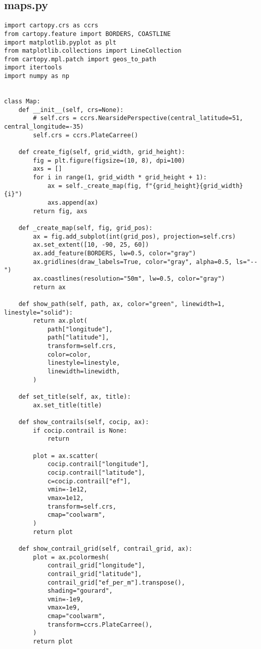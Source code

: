 \subsection{maps.py}
\begin{verbatim}
import cartopy.crs as ccrs
from cartopy.feature import BORDERS, COASTLINE
import matplotlib.pyplot as plt
from matplotlib.collections import LineCollection
from cartopy.mpl.patch import geos_to_path
import itertools
import numpy as np


class Map:
    def __init__(self, crs=None):
        # self.crs = ccrs.NearsidePerspective(central_latitude=51, central_longitude=-35)
        self.crs = ccrs.PlateCarree()

    def create_fig(self, grid_width, grid_height):
        fig = plt.figure(figsize=(10, 8), dpi=100)
        axs = []
        for i in range(1, grid_width * grid_height + 1):
            ax = self._create_map(fig, f"{grid_height}{grid_width}{i}")
            axs.append(ax)
        return fig, axs

    def _create_map(self, fig, grid_pos):
        ax = fig.add_subplot(int(grid_pos), projection=self.crs)
        ax.set_extent([10, -90, 25, 60])
        ax.add_feature(BORDERS, lw=0.5, color="gray")
        ax.gridlines(draw_labels=True, color="gray", alpha=0.5, ls="--")
        ax.coastlines(resolution="50m", lw=0.5, color="gray")
        return ax

    def show_path(self, path, ax, color="green", linewidth=1, linestyle="solid"):
        return ax.plot(
            path["longitude"],
            path["latitude"],
            transform=self.crs,
            color=color,
            linestyle=linestyle,
            linewidth=linewidth,
        )

    def set_title(self, ax, title):
        ax.set_title(title)

    def show_contrails(self, cocip, ax):
        if cocip.contrail is None:
            return

        plot = ax.scatter(
            cocip.contrail["longitude"],
            cocip.contrail["latitude"],
            c=cocip.contrail["ef"],
            vmin=-1e12,
            vmax=1e12,
            transform=self.crs,
            cmap="coolwarm",
        )
        return plot

    def show_contrail_grid(self, contrail_grid, ax):
        plot = ax.pcolormesh(
            contrail_grid["longitude"],
            contrail_grid["latitude"],
            contrail_grid["ef_per_m"].transpose(),
            shading="gourard",
            vmin=-1e9,
            vmax=1e9,
            cmap="coolwarm",
            transform=ccrs.PlateCarree(),
        )
        return plot


\end{verbatim}
